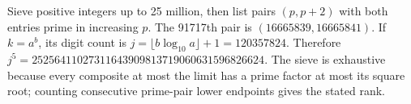 Sieve positive integers up to 25 million, then list pairs $(p,p+2)$ with both entries prime in increasing $p$. The 91717th pair is $(16665839,16665841)$. If $k=a^b$, its digit count is $j=\lfloor b\log_{10}a\rfloor+1=120357824$. Therefore $\boxed{j^5=25256411027311643909813719060631596826624}$. The sieve is exhaustive because every composite at most the limit has a prime factor at most its square root; counting consecutive prime-pair lower endpoints gives the stated rank.
